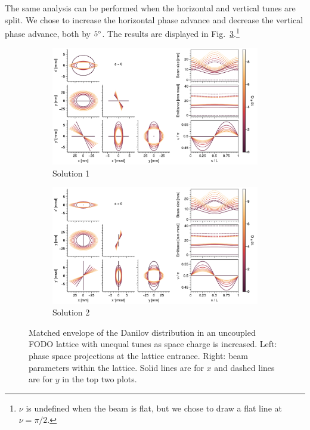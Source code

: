 The same analysis can be performed when the horizontal and vertical tunes are split. We chose to increase the horizontal phase advance and decrease the vertical phase advance, both by $5\degree$. The results are displayed in Fig.~\ref{fig:matched_vs_sc_fodo_split}.\footnote{$\nu$ is undefined when the beam is flat, but we chose to draw a flat line at $\nu = \pi/2$.}
%
\begin{figure}[!p]
    \begin{subfigure}{1.0\textwidth}
        \includegraphics[width=\textwidth]{Images/chapter2/matched_vs_sc_fodo_split_mode1.pdf}
        \caption{Solution 1}
        \label{fig:matched_vs_sc_fodo_split_a}
    \end{subfigure}
    \vfill
    \vfill
    \begin{subfigure}{1.0\textwidth}
        \centering
        \includegraphics[width=\textwidth]{Images/chapter2/matched_vs_sc_fodo_split_mode2.pdf}
        \caption{Solution 2}
        \label{fig:matched_vs_sc_fodo_split_b}
    \end{subfigure}
    \caption{Matched envelope of the Danilov distribution in an uncoupled FODO lattice with unequal tunes as space charge is increased. Left: phase space projections at the lattice entrance. Right: beam parameters within the lattice. Solid lines are for $x$ and dashed lines are for $y$ in the top two plots.}
    \label{fig:matched_vs_sc_fodo_split}
\end{figure}
